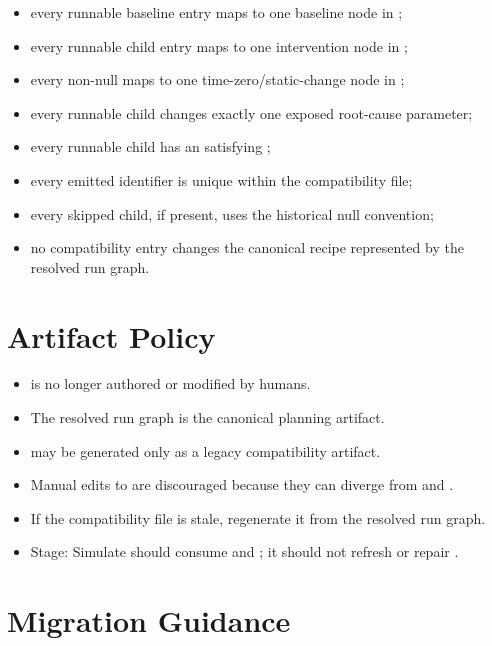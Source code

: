 \documentclass[11pt]{article}
\begin{document}
\begin{itemize}
\item every runnable baseline entry maps to one baseline node in ;
\item every runnable child entry maps to one intervention node in ;
\item every non-null  maps to one time-zero/static-change node in ;
\item every runnable child changes exactly one exposed root-cause parameter;
\item every runnable child has an  satisfying ;
\item every emitted identifier is unique within the compatibility file;
\item every skipped child, if present, uses the historical null convention;
\item no compatibility entry changes the canonical recipe represented by the resolved run graph.
\end{itemize}

\section*{Artifact Policy}

\begin{itemize}
\item {} is no longer authored or modified by humans.
\item The resolved run graph is the canonical planning artifact.
\item {} may be generated only as a legacy compatibility artifact.
\item Manual edits to  are discouraged because they can diverge from  and .
\item If the compatibility file is stale, regenerate it from the resolved run graph.
\item Stage: Simulate should consume  and ; it should not refresh or repair .
\end{itemize}

\section*{Migration Guidance}
\end{document}
